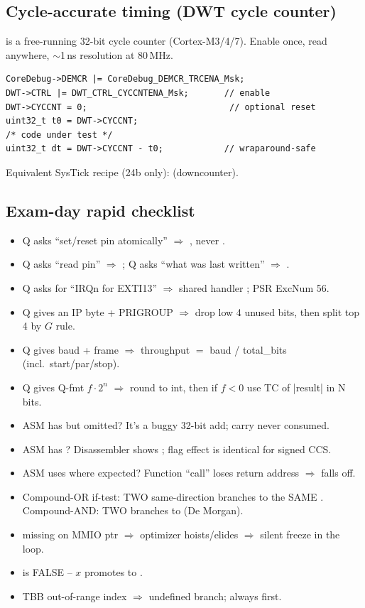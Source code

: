 \subsection{Cycle-accurate timing (DWT cycle counter)}
 is a free-running 32-bit cycle counter (Cortex-M3/4/7). Enable once, read anywhere, $\sim$1\,ns resolution at 80\,MHz.
\begin{lstlisting}[language={}]
CoreDebug->DEMCR |= CoreDebug_DEMCR_TRCENA_Msk;
DWT->CTRL |= DWT_CTRL_CYCCNTENA_Msk;       // enable
DWT->CYCCNT = 0;                            // optional reset
uint32_t t0 = DWT->CYCCNT;
/* code under test */
uint32_t dt = DWT->CYCCNT - t0;            // wraparound-safe
\end{lstlisting}
Equivalent SysTick recipe (24b only):  (downcounter).

\subsection{Exam-day rapid checklist}
\begin{itemize}
\item Q asks ``set/reset pin atomically'' $\Rightarrow$ , never .
\item Q asks ``read pin'' $\Rightarrow$ ; Q asks ``what was last written'' $\Rightarrow$ .
\item Q asks for ``IRQn for EXTI13'' $\Rightarrow$ shared handler ; PSR ExcNum 56.
\item Q gives an IP byte + PRIGROUP $\Rightarrow$ drop low 4 unused bits, then split top 4 by $G$ rule.
\item Q gives baud + frame $\Rightarrow$ throughput $=$ baud / total\_bits (incl.\ start/par/stop).
\item Q gives Q-fmt $f \cdot 2^n$ $\Rightarrow$ round to int, then if $f<0$ use TC of |result| in N bits.
\item ASM has  but  omitted? It's a buggy 32-bit add; carry never consumed.
\item ASM has ? Disassembler shows ; flag effect is identical for signed CCS.
\item ASM uses  where  expected? Function ``call'' loses return address $\Rightarrow$ falls off.
\item Compound-OR if-test: TWO same-direction branches to the SAME . Compound-AND: TWO branches to  (De Morgan).
\item {} missing on MMIO ptr $\Rightarrow$ optimizer hoists/elides $\Rightarrow$ silent freeze in the loop.
\item {} is FALSE -- $x$ promotes to .
\item TBB out-of-range index $\Rightarrow$ undefined branch; always  first.
\end{itemize}

